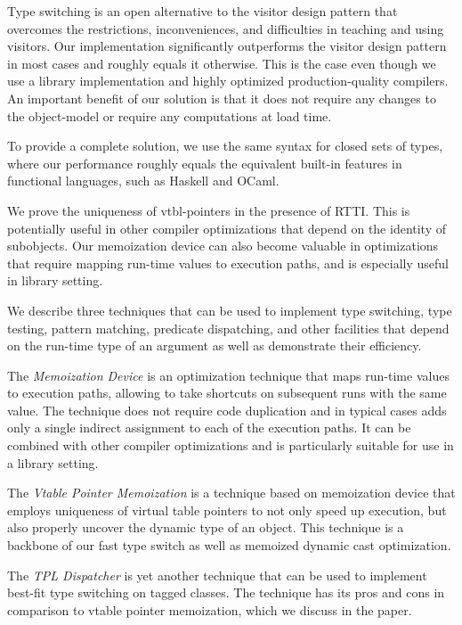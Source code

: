 Type switching is an open alternative to the visitor design pattern that overcomes 
the restrictions, inconveniences, and difficulties in teaching and using 
visitors. Our implementation significantly
outperforms the visitor design pattern in most cases and roughly equals it otherwise.
This is the case even though we use a library implementation and highly optimized
production-quality compilers. An important benefit of our solution is that it does not 
require any changes to the \Cpp{} object-model or require any computations at load 
time.

To provide a complete solution, we use the same syntax for closed sets of types, where our
performance roughly equals the equivalent built-in features in functional languages,
such as Haskell and OCaml.

We prove the uniqueness of vtbl-pointers in the presence of RTTI. This is 
potentially useful in other compiler optimizations that depend on the 
identity of subobjects. Our memoization device can also become valuable in 
optimizations that require mapping run-time values to execution paths, 
and is especially useful in library setting.

We describe three techniques that can be used to implement type switching, type 
testing, pattern matching, predicate dispatching, and other facilities that 
depend on the run-time type of an argument as well as demonstrate their efficiency.

The \emph{Memoization Device} is an optimization technique that maps run-time values 
to execution paths, allowing to take shortcuts on subsequent runs with the same 
value. The technique does not require code duplication and in typical cases adds 
only a single indirect assignment to each of the execution paths. It can be 
combined with other compiler optimizations and is particularly suitable for use 
in a library setting.

The \emph{Vtable Pointer Memoization} is a technique based on memoization device that 
employs uniqueness of virtual table pointers to not only speed up execution, but 
also properly uncover the dynamic type of an object. This technique is a 
backbone of our fast type switch as well as memoized dynamic cast optimization.

The \emph{TPL Dispatcher} is yet another technique that can be used to 
implement best-fit type switching on tagged classes. The technique has its pros 
and cons in comparison to vtable pointer memoization, which we discuss in the paper.

